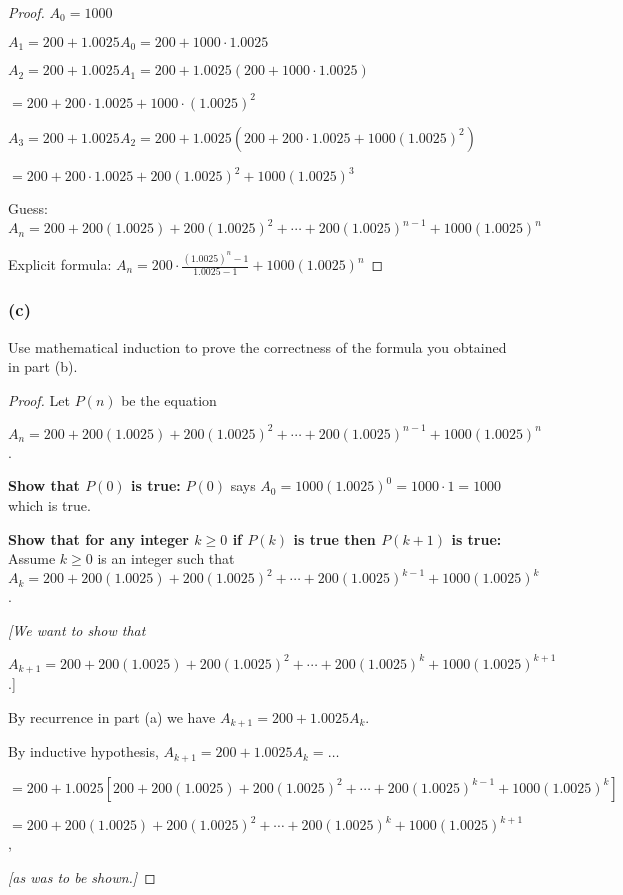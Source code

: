 \documentclass[14pt]{extarticle}
\newcommand{\dps}{\displaystyle}
\begin{document}
\begin{proof}
    \(A_0 = 1000\)

    \(A_1 = 200 + 1.0025 A_0 = 200 + 1000 \cdot 1.0025\)

    \(A_2 = 200 + 1.0025 A_1 = 200 + 1.0025 (200 + 1000 \cdot 1.0025)\)

    \(= 200 + 200 \cdot 1.0025 + 1000 \cdot (1.0025)^2\)

    \(A_3 = 200 + 1.0025 A_2 = 200 + 1.0025 (200 + 200 \cdot 1.0025 + 1000(1.0025)^2) \)

    \(= 200 + 200 \cdot 1.0025 + 200(1.0025)^2 + 1000(1.0025)^3\)

    Guess: \(A_n = 200 + 200(1.0025) + 200(1.0025)^2 + \cdots + 200(1.0025)^{n-1} + 1000(1.0025)^n\)

    Explicit formula: \(A_n = \dps 200 \cdot \frac{(1.0025)^n - 1}{1.0025 - 1} + 1000(1.0025)^n\)
\end{proof}

\subsubsection{(c)}
Use mathematical induction to prove the correctness of the formula you obtained in part (b).

\begin{proof}
    Let $P(n)$ be the equation

    \(A_n = 200 + 200(1.0025) + 200(1.0025)^2 + \cdots + 200(1.0025)^{n-1} + 1000(1.0025)^n\).

        {\bf Show that $P(0)$ is true:} $P(0)$ says \(A_0 = 1000(1.0025)^0 = 1000 \cdot 1 = 1000\) which is true.

        {\bf Show that for any integer \(k \geq 0\) if $P(k)$ is true then \(P(k+1)\) is true:}
    Assume \(k \geq 0\) is an integer such that
    \(A_k = 200 + 200(1.0025) + 200(1.0025)^2 + \cdots + 200(1.0025)^{k-1} + 1000(1.0025)^k\).
        {\it [We want to show that

                \(A_{k+1} = 200 + 200(1.0025) + 200(1.0025)^2 + \cdots + 200(1.0025)^k + 1000(1.0025)^{k+1}\).]}

    By recurrence in part (a) we have \(A_{k+1} = 200 + 1.0025 A_k.\)

    By inductive hypothesis,
    \(A_{k+1} = 200 + 1.0025 A_k = \ldots\)

    \(= 200 + 1.0025[200 + 200(1.0025) + 200(1.0025)^2 + \cdots + 200(1.0025)^{k-1} + 1000(1.0025)^k]\)

    \(= 200 + 200(1.0025) + 200(1.0025)^2 + \cdots + 200(1.0025)^k + 1000(1.0025)^{k+1}\),

    {\it [as was to be shown.]}
\end{proof}
\end{document}
